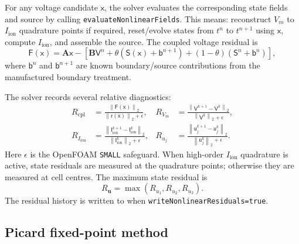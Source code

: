\documentclass[11pt,a4paper]{article}
\newcommand{\code}[1]{\texttt{\small #1}}
\newcommand{\Vm}{V_m}
\newcommand{\Iion}{I_{\mathrm{ion}}}
\newcommand{\Aimp}{\mathbf{A}}
\newcommand{\Bimp}{\mathbf{B}}
\newcommand{\Fres}{\mathsf{F}}
\newcommand{\norm}[1]{\left\lVert #1 \right\rVert}
\begin{document}
For any voltage candidate $\mathsf{x}$, the solver evaluates the corresponding
state fields and source by calling \code{evaluateNonlinearFields}. This means:
reconstruct $\Vm$ to $\Iion$ quadrature points if required, reset/evolve states
from $t^n$ to $t^{n+1}$ using $\mathsf{x}$, compute $\Iion$, and assemble the
source. The coupled voltage residual is
\begin{equation}
  \Fres(\mathsf{x})
  =
  \Aimp\mathsf{x}
  -
  \left[
    \Bimp\mathsf{V}^{n}
    +\theta\left(\mathsf{S}(\mathsf{x})+\mathsf{b}^{n+1}\right)
    +(1-\theta)\left(\mathsf{S}^{n}+\mathsf{b}^{n}\right)
  \right],
  \label{eq:nonlinear-residual}
\end{equation}
where $\mathsf{b}^{n}$ and $\mathsf{b}^{n+1}$ are known boundary/source
contributions from the manufactured boundary treatment.

The solver records several relative diagnostics:
\begin{align}
  R_{\mathrm{cpl}} &=
  \frac{\norm{\Fres(\mathsf{x})}_2}
       {\norm{\mathsf{r}(\mathsf{x})}_2+\epsilon},
  &
  R_{\Vm} &=
  \frac{\norm{\mathsf{V}^{k+1}-\mathsf{V}^{k}}_2}
       {\norm{\mathsf{V}^{k}}_2+\epsilon},\\
  R_{\Iion} &=
  \frac{\norm{\mathsf{I}^{k+1}_{\mathrm{ion}}-\mathsf{I}^{k}_{\mathrm{ion}}}_2}
       {\norm{\mathsf{I}^{k}_{\mathrm{ion}}}_2+\epsilon},
  &
  R_{u_j} &=
  \frac{\norm{\mathsf{u}^{k+1}_{j}-\mathsf{u}^{k}_{j}}_2}
       {\norm{\mathsf{u}^{k}_{j}}_2+\epsilon}.
\end{align}
Here $\epsilon$ is the OpenFOAM \code{SMALL} safeguard. When high-order
$\Iion$ quadrature is active, state residuals are measured at the quadrature
points; otherwise they are measured at cell centres. The maximum state residual
is
\begin{equation}
  R_{\mathbf{u}}=\max(R_{u_1},R_{u_2},R_{u_3}).
\end{equation}
The residual history is written to
when \code{writeNonlinearResiduals=true}.

\subsection{Picard fixed-point method}
\end{document}
